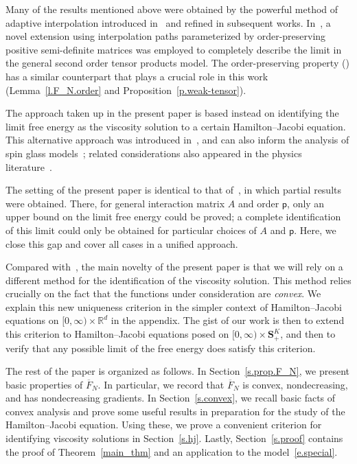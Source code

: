 \documentclass[10pt]{amsart}
\theoremstyle{definition}\newtheorem{defi}[theo]{Definition}\newtheorem{rema}[theo]{Remark}\newtheorem{exam}[theo]{Example}\newtheorem{exem}[theo]{Example}\newtheorem{nota}[theo]{Notation}
\newcommand{\R}{\mathbb{R}}
\renewcommand{\S}{\mathbf{S}}
\newcommand{\sfp}{\mathsf{p}}
\renewcommand{\bar}{\overline}
\begin{document}
Many of the results mentioned above were obtained by the powerful method of adaptive interpolation introduced in~\cite{barbier2019adaptive2,barbier2019adaptive} and refined in subsequent works. In~\cite{reeves2020information}, a novel extension using interpolation paths parameterized by order-preserving positive semi-definite matrices was employed to completely describe the limit in the general second order tensor products model. The order-preserving property (\cite[Proposition~4]{reeves2020information}) has a similar counterpart that plays a crucial role in this work (Lemma~\ref{l.F_N.order} and Proposition~\ref{p.weak-tensor}).

The approach taken up in the present paper is based instead on identifying the limit free energy as the viscosity solution to a certain Hamilton--Jacobi equation. This alternative approach was introduced in~\cite{mourrat2019hamilton,mourrat2018hamilton}, and can also inform the analysis of spin glass models~\cite{mourrat2019parisi,mourrat2020free, mourrat2020nonconvex,mourrat2020extending}; related considerations also appeared in the physics literature~\cite{barra2010replica, barra2013mean,genovese2009mechanical, guerra2001sum}.


The setting of the present paper is identical to that of~\cite{HBJ}, in which partial results were obtained. There, for general interaction matrix $A$ and order $\sfp$, only an upper bound on the limit free energy could be proved; a complete identification of this limit could only be obtained for particular choices of $A$ and $\sfp$. Here, we close this gap and cover all cases in a unified approach.

Compared with~\cite{HBJ}, the main novelty of the present paper is that we will rely on a different method for the identification of the viscosity solution. This method relies crucially on the fact that the functions under consideration are \emph{convex}. We explain this new uniqueness criterion in the simpler context of Hamilton--Jacobi equations on $[0,\infty) \times \R^d$ in the appendix. The gist of our work is then to extend this criterion to Hamilton--Jacobi equations posed on $[0,\infty) \times \S^K_+$, and then to verify that any possible limit of the free energy does satisfy this criterion.

The rest of the paper is organized as follows. In Section~\ref{s.prop.F_N}, we present basic properties of $\bar F_N$. In particular, we record that $\bar F_N$ is convex, nondecreasing, and has nondecreasing gradients. In Section~\ref{s.convex}, we recall basic facts of convex analysis and prove some useful results in preparation for the study of the Hamilton--Jacobi equation. Using these, we prove a convenient criterion for identifying viscosity solutions in Section~\ref{s.hj}. Lastly, Section~\ref{s.proof} contains the proof of Theorem~\ref{main_thm} and an application to the model~\eqref{e.special}.
\end{document}
